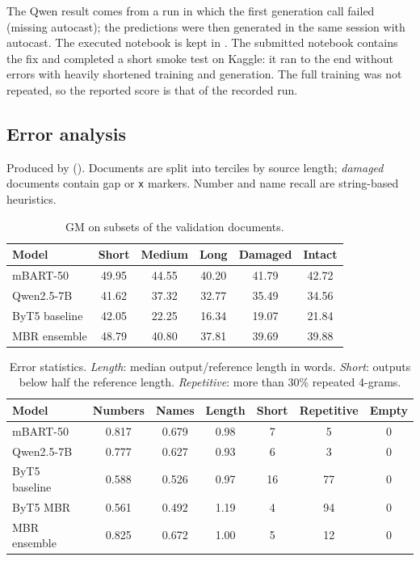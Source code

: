\documentclass[a4paper,12pt]{article}
\begin{document}
The Qwen result comes from a run in which the first generation call failed (missing autocast); the predictions were then generated in the same session with autocast. The executed notebook is kept in . The submitted notebook contains the fix and completed a short smoke test on Kaggle: it ran to the end without errors with heavily shortened training and generation. The full training was not repeated, so the reported score is that of the recorded run.

\subsection{Error analysis}
Produced by  (). Documents are split into terciles by source length; \emph{damaged} documents contain gap or \texttt{x} markers. Number and name recall are string-based heuristics.

\begin{table}[H]
    \centering\small
    \caption{GM on subsets of the validation documents.}
    \label{tab:subsets}
    \begin{tabular}{lccccc}
        \toprule
        \textbf{Model} & \textbf{Short} & \textbf{Medium} & \textbf{Long} & \textbf{Damaged} & \textbf{Intact} \\
        \midrule
        mBART-50 & 49.95 & 44.55 & 40.20 & 41.79 & 42.72 \\
        Qwen2.5-7B & 41.62 & 37.32 & 32.77 & 35.49 & 34.56 \\
        ByT5 baseline & 42.05 & 22.25 & 16.34 & 19.07 & 21.84 \\
        MBR ensemble & 48.79 & 40.80 & 37.81 & 39.69 & 39.88 \\
        \bottomrule
    \end{tabular}
\end{table}

\begin{table}[H]
    \centering\small
    \caption{Error statistics. \emph{Length}: median output/reference length in words. \emph{Short}: outputs below half the reference length. \emph{Repetitive}: more than 30\% repeated 4-grams.}
    \label{tab:errors}
    \begin{tabular}{lcccccc}
        \toprule
        \textbf{Model} & \textbf{Numbers} & \textbf{Names} & \textbf{Length} & \textbf{Short} & \textbf{Repetitive} & \textbf{Empty} \\
        \midrule
        mBART-50 & 0.817 & 0.679 & 0.98 & 7 & 5 & 0 \\
        Qwen2.5-7B & 0.777 & 0.627 & 0.93 & 6 & 3 & 0 \\
        ByT5 baseline & 0.588 & 0.526 & 0.97 & 16 & 77 & 0 \\
        ByT5 MBR & 0.561 & 0.492 & 1.19 & 4 & 94 & 0 \\
        MBR ensemble & 0.825 & 0.672 & 1.00 & 5 & 12 & 0 \\
        \bottomrule
    \end{tabular}
\end{table}
\end{document}
